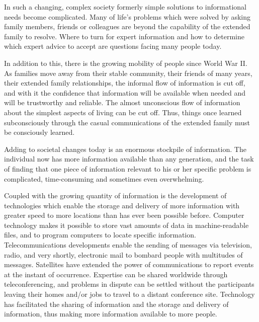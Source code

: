 \documentclass[a4paper]{article}
\begin{document}
\par
In such a changing, complex society formerly simple solutions to informational needs become complicated. Many of life’s problems which were solved by asking family members, friends or colleagues are beyond the capability of the extended family to resolve. Where to turn for expert information and how to determine which expert advice to accept are questions facing many people today.

\par
In addition to this, there is the growing mobility of people since World War II. As families move away from their stable community, their friends of many years, their extended family relationships, the informal flow of information is cut off, and with it the confidence that information will be available when needed and will be trustworthy and reliable. The almost unconscious flow of information about the simplest aspects of living can be cut off. Thus, things once learned subconsciously through the casual communications of the extended family must be consciously learned.

\par
Adding to societal changes today is an enormous stockpile of information. The individual now has more information available than any generation, and the task of finding that one piece of information relevant to his or her specific problem is complicated, time-consuming and sometimes even overwhelming.

\par
Coupled with the growing quantity of information is the development of technologies which enable the storage and delivery of more information with greater speed to more locations than has ever been possible before. Computer technology makes it possible to store vast amounts of data in machine-readable files, and to program computers to locate specific information. Telecommunications developments enable the sending of messages via television, radio, and very shortly, electronic mail to bombard people with multitudes of messages. Satellites have extended the power of communications to report events at the instant of occurrence. Expertise can be shared worldwide through teleconferencing, and problems in dispute can be settled without the participants leaving their homes and/or jobs to travel to a distant conference site. Technology has facilitated the sharing of information and the storage and delivery of information, thus making more information available to more people.
\end{document}
